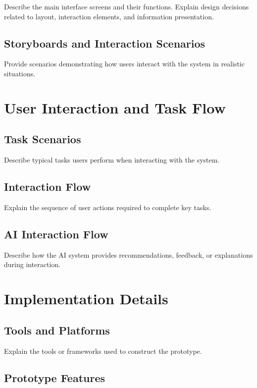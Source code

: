 \documentclass[sigconf]{acmart}
\begin{document}
Describe the main interface screens and their functions. Explain design decisions related to layout, interaction elements, and information presentation.

\subsection{Storyboards and Interaction Scenarios}

Provide scenarios demonstrating how users interact with the system in realistic situations.

\section{User Interaction and Task Flow}

\subsection{Task Scenarios}

Describe typical tasks users perform when interacting with the system.

\subsection{Interaction Flow}

Explain the sequence of user actions required to complete key tasks.

\subsection{AI Interaction Flow}

Describe how the AI system provides recommendations, feedback, or explanations during interaction.

\section{Implementation Details}

\subsection{Tools and Platforms}

Explain the tools or frameworks used to construct the prototype.

\subsection{Prototype Features}
\end{document}

